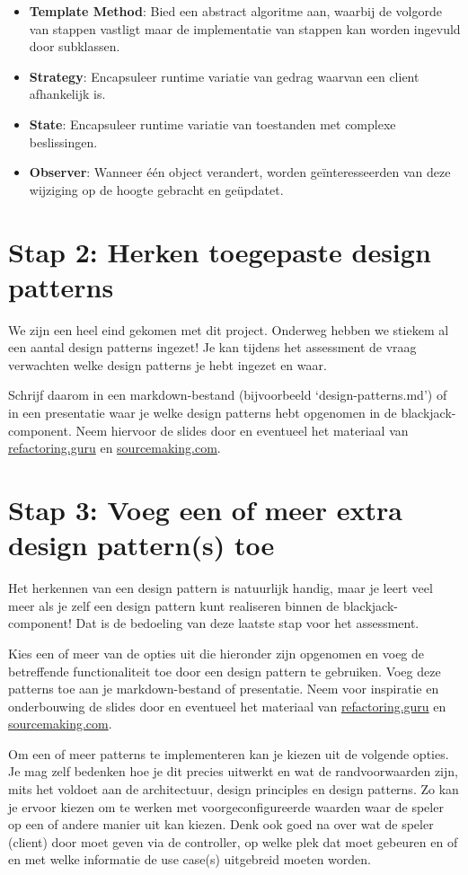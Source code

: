 \documentclass[dutch,a4paper,12pt,doubleside]{book}
\begin{document}
\begin{itemize}
    \item \textbf{Template Method}:
    Bied een abstract algoritme aan, 
    waarbij de volgorde van stappen vastligt 
    maar de implementatie van stappen kan 
    worden ingevuld door subklassen.
    \item \textbf{Strategy}:
    Encapsuleer runtime variatie van gedrag 
    waarvan een client afhankelijk is.
    \item \textbf{State}:
    Encapsuleer runtime variatie van toestanden 
    met complexe beslissingen.
    \item \textbf{Observer}:
    Wanneer één object verandert, 
    worden geïnteresseerden van deze 
    wijziging op de hoogte gebracht en geüpdatet.
\end{itemize}

\section{Stap 2: Herken toegepaste design patterns}
We zijn een heel eind gekomen met dit project. Onderweg hebben we stiekem al 
een aantal design patterns ingezet! Je kan tijdens het assessment de vraag 
verwachten welke design patterns je hebt ingezet en waar. 

Schrijf daarom in een markdown-bestand (bijvoorbeeld `design-patterns.md')
of in een presentatie waar je welke design patterns hebt opgenomen in de blackjack-component. 
Neem hiervoor de slides door en eventueel het materiaal van 
\url{refactoring.guru} en \url{sourcemaking.com}.

\newpage
\section{Stap 3: Voeg een of meer extra design pattern(s) toe}
Het herkennen van een design pattern is natuurlijk handig, maar je leert veel meer 
als je zelf een design pattern kunt realiseren binnen de blackjack-component!
Dat is de bedoeling van deze laatste stap voor het assessment.

Kies een of meer van de opties uit die hieronder zijn opgenomen en voeg de 
betreffende functionaliteit toe door een design pattern te gebruiken. 
Voeg deze patterns toe aan je markdown-bestand of presentatie.
Neem voor inspiratie en onderbouwing de slides door 
en eventueel het materiaal van \url{refactoring.guru} en \url{sourcemaking.com}.

Om een of meer patterns te implementeren kan je kiezen uit de volgende opties.
Je mag zelf bedenken hoe je dit precies uitwerkt en wat de randvoorwaarden zijn,
mits het voldoet aan de architectuur, design principles en design patterns.
Zo kan je ervoor kiezen om te werken met voorgeconfigureerde waarden waar de speler
op een of andere manier uit kan kiezen.
Denk ook goed na over wat de speler (client) door moet geven via de controller,
op welke plek dat moet gebeuren en of en met welke informatie de use case(s) 
uitgebreid moeten worden.
\end{document}
